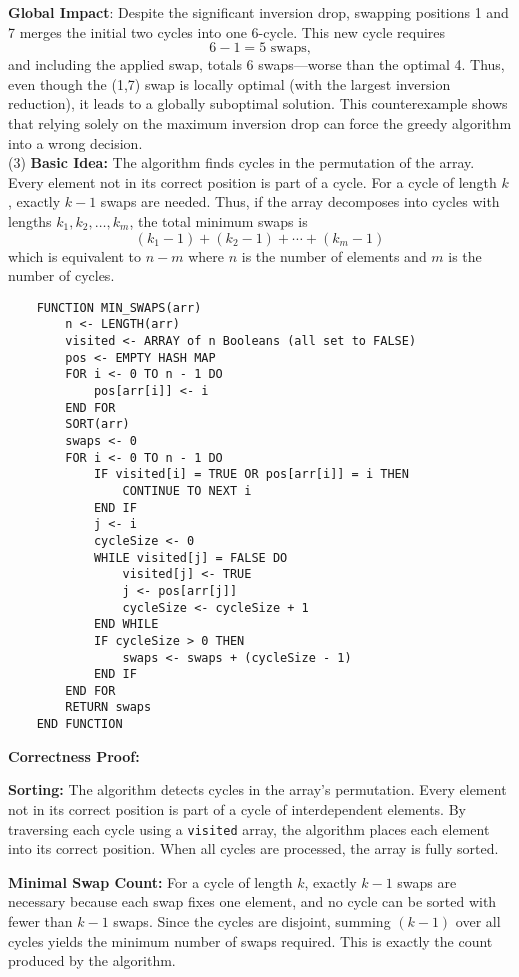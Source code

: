 \documentclass[letterpaper, 11pt]{article}
\newcommand{\1}{\mathds{1}}	%
\theoremstyle{definition}
\newenvironment{solution}{{\par\noindent\it Solution.}}{}
\begin{document}
\begin{solution}
\textbf{Global Impact}:
Despite the significant inversion drop, swapping positions 1 and 7 merges the initial two cycles into one 6-cycle. This new cycle requires
\[
6-1=5 \text{ swaps,}
\]
and including the applied swap, totals 6 swaps—worse than the optimal 4.
Thus, even though the (1,7) swap is locally optimal (with the largest inversion reduction), it leads to a globally suboptimal solution. This counterexample shows that relying solely on the maximum inversion drop can force the greedy algorithm into a wrong decision.
\\(3)
\textbf{Basic Idea:}  
The algorithm finds cycles in the permutation of the array. Every element not in its correct position is part of a cycle. For a cycle of length \( k \), exactly \( k - 1 \) swaps are needed. Thus, if the array decomposes into cycles with lengths \( k_1, k_2, \dots, k_m \), the total minimum swaps is 
\[
(k_1 - 1) + (k_2 - 1) + \cdots + (k_m - 1)
\]
which is equivalent to \( n - m \) where \( n \) is the number of elements and \( m \) is the number of cycles.
\begin{lstlisting}
    FUNCTION MIN_SWAPS(arr)
        n <- LENGTH(arr)
        visited <- ARRAY of n Booleans (all set to FALSE)
        pos <- EMPTY HASH MAP
        FOR i <- 0 TO n - 1 DO
            pos[arr[i]] <- i
        END FOR
        SORT(arr)
        swaps <- 0
        FOR i <- 0 TO n - 1 DO
            IF visited[i] = TRUE OR pos[arr[i]] = i THEN
                CONTINUE TO NEXT i
            END IF
            j <- i
            cycleSize <- 0
            WHILE visited[j] = FALSE DO
                visited[j] <- TRUE
                j <- pos[arr[j]]  
                cycleSize <- cycleSize + 1
            END WHILE
            IF cycleSize > 0 THEN
                swaps <- swaps + (cycleSize - 1)
            END IF
        END FOR
        RETURN swaps
    END FUNCTION
    \end{lstlisting}
    \textbf{Correctness Proof:}

    \medskip
    
    \textbf{Sorting:}  
    The algorithm detects cycles in the array's permutation. Every element not in its correct position is part of a cycle of interdependent elements. By traversing each cycle using a \texttt{visited} array, the algorithm places each element into its correct position. When all cycles are processed, the array is fully sorted.
    
    \medskip
    
    \textbf{Minimal Swap Count:}  
    For a cycle of length $k$, exactly $k-1$ swaps are necessary because each swap fixes one element, and no cycle can be sorted with fewer than $k-1$ swaps. Since the cycles are disjoint, summing $(k-1)$ over all cycles yields the minimum number of swaps required. This is exactly the count produced by the algorithm.
    
\end{solution}
\newpage
\end{document}

